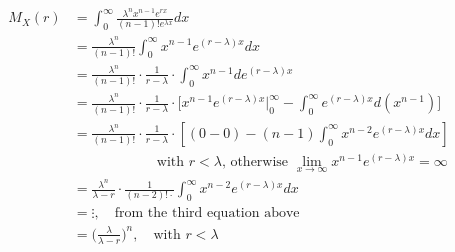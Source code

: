 \documentclass[UTF8]{article}
\begin{document}
\begin{enumerate}
            \begin{equation*}
                \begin{split}
                    M_X(r) &=\int^\infty_{0}\frac{\lambda^nx^{n-1}e^{rx}}{(n-1)!e^{\lambda x}}dx\\
                    &=\frac{\lambda^n}{(n-1)!}\int^\infty_0x^{n-1}e^{(r-\lambda)x}dx\\
                    &=\frac{\lambda^n}{(n-1)!}\cdot\frac{1}{r-\lambda}\cdot\int^\infty_0x^{n-1}de^{(r-\lambda)x}\\
                    &=\frac{\lambda^n}{(n-1)!}\cdot\frac{1}{r-\lambda}\cdot\bigg[x^{n-1}e^{(r-\lambda)x}\bigg|^\infty_0-\int^\infty_0e^{(r-\lambda)x}d(x^{n-1})\bigg]\\
                    &=\frac{\lambda^n}{(n-1)!}\cdot\frac{1}{r-\lambda}\cdot[(0-0)-(n-1)\int^\infty_0x^{n-2}e^{(r-\lambda)x}dx]\\
                    & \qquad\qquad\qquad\text{with $r<\lambda$, otherwise $\lim_{x\rightarrow\infty}x^{n-1}e^{(r-\lambda)x}=\infty$}\\\
                    &= \frac{\lambda^n}{\lambda-r}\cdot\frac{1}{(n-2)!\cdot}\int^\infty_0x^{n-2}e^{(r-\lambda)x}dx\\
                    &=\vdots,\quad\text{from the third equation above}\\
                    &=\bigg(\frac{\lambda}{\lambda-r}\bigg)^n,\quad\text{with $r<\lambda$}
                \end{split}
            \end{equation*}


\end{enumerate}
\end{document}
